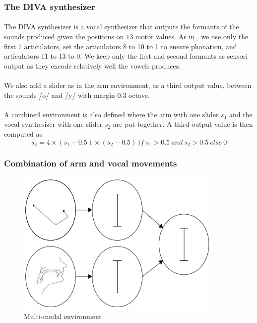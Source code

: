 \documentclass[12pt]{article}
\begin{document}

				
		\subsubsection{The DIVA synthesizer}

			\paragraph{}
			The DIVA synthesizer is a vocal synthesizer that outputs the formants of the sounds produced given the positions on $13$ motor values.
			As in \cite{moulin-frier_self-organization_2014}, we use only the first $7$ articulators, set the articulators 8 to 10 to 1 to ensure phonation,
			and articulators 11 to 13 to 0. We keep only the first and second formants as sensori output as they encode relatively well the vowels produces. 

			\paragraph{}
			We also add a slider as in the arm environment, as a third output value, between the sounds /o/ and /y/ with margin $0.3$ octave.
			
			\paragraph{}
			A combined environment is also defined where the arm with one slider $s_1$ and the vocal synthesizer with one slider $s_2$ are put together.
			A third output value is then computed as 
			$$s_3 = 4 \times (s_1 - 0.5) \times (s_2 - 0.5) ~if~ s_1 > 0.5 ~and~ s_2 > 0.5~ else~ 0$$
			
			
			
		\subsubsection{Combination of arm and vocal movements}

			\begin{figure}[H]
				\centering
				\includegraphics[width=10cm]{./include/multimodal.png}
				\caption{Multi-modal environment}
			\end{figure}
			
\end{document}
